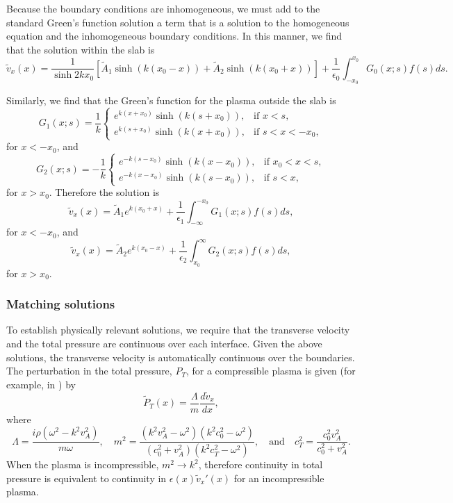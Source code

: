 \documentclass{aastex61}
\begin{document}
Because the boundary conditions are inhomogeneous, we must add to the standard Green's function solution a term that is a solution to the homogeneous equation and the inhomogeneous boundary conditions. In this manner, we find that the solution within the slab is
\begin{equation}
\tilde{v}_x(x) = \frac{1}{\sinh{2kx_0}} \left[ \tilde{A}_1\sinh(k(x_0 - x)) + \tilde{A}_2\sinh(k(x_0 + x)) \right] + \frac{1}{\epsilon_0}\int_{-x_0}^{x_0} G_0(x;s) f(s) ds.
\end{equation}

Similarly, we find that the Green's function for the plasma outside the slab is 
\begin{equation}
G_1(x;s) = \frac{1}{k}
\begin{cases}
e^{k(x + x_0)}\sinh(k(s + x_0)), & \text{if } x < s, \\
e^{k(s + x_0)}\sinh(k(x + x_0)), & \text{if } s < x < -x_0,
\end{cases}
\end{equation}
for $x < -x_0$, and
\begin{equation}
G_2(x;s) = -\frac{1}{k}
\begin{cases}
e^{-k(s - x_0)}\sinh(k(x - x_0)), & \text{if } x_0 < x < s, \\
e^{-k(x - x_0)}\sinh(k(s - x_0)), & \text{if } s < x,
\end{cases}
\end{equation}
for $x > x_0$. Therefore the solution is
\begin{equation}
\tilde{v}_x(x) = \tilde{A}_1e^{k(x_0 + x)} + \frac{1}{\epsilon_1}\int_{-\infty}^{-x_0} G_1(x;s) f(s) ds,
\end{equation}
for $x < -x_0$, and
\begin{equation}
\tilde{v}_x(x) = \tilde{A}_2e^{k(x_0 - x)} + \frac{1}{\epsilon_2}\int_{x_0}^{\infty} G_2(x;s) f(s) ds,
\end{equation}
for $x > x_0$.


\subsubsection{Matching solutions}
To establish physically relevant solutions, we require that the transverse velocity and the total pressure are continuous over each interface. Given the above solutions, the transverse velocity is automatically continuous over the boundaries. The perturbation in the total pressure, $P_T$, for a compressible plasma is given (for example, in \cite{all_etal17}) by
\begin{equation}
\tilde{P}_T(x) = \frac{\Lambda}{m}\frac{d\tilde{v}_x}{d x},
\end{equation}
where
\begin{equation}
\Lambda = \frac{i\rho(\omega^2 - k^2v_A^2)}{m\omega},
\quad
m^2 = \frac{(k^2v_A^2 - \omega^2)(k^2c_0^2 - \omega^2)}{(c_0^2 + v_A^2)(k^2c_T^2 - \omega^2)},
\quad \text{and} \quad
c_T^2 = \frac{c_0^2 v_A^2}{c_0^2 + v_A^2}.
\end{equation}
When the plasma is incompressible, $m^2 \to k^2$, therefore continuity in total pressure is equivalent to continuity in $\epsilon(x)\tilde{v}_x'(x)$ for an incompressible plasma.
\end{document}
